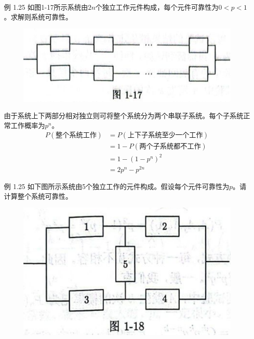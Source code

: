 \documentclass{beamer}
\begin{document}
	\begin{frame}
		例 1.25 如图1-17所示系统由$2n$个独立工作元件构成，每个元件可靠性为$0 < p < 1$。求解则系统可靠性。
		\begin{figure}[H]
			\centering
			\includegraphics[scale = 0.3]{figures/figure1-17.png}
		\end{figure}
	\end{frame}
	
	\begin{frame}
		由于系统上下两部分相对独立则可将整个系统分为两个串联子系统。每个子系统正常工作概率为$p^n$。
		\begin{align}
			P(\text{整个系统工作}) & = P(\text{上下子系统至少一个工作}) \\
			& = 1 - P(\text{两个子系统都不工作}) \\
			& = 1 - (1 - p^n)^2\\
			& = 2p^n - p^{2n}
		\end{align}
	\end{frame}
	
	\begin{frame}
		例 1.25 如下图所示系统由5个独立工作的元件构成。假设每个元件可靠性为$p$。请计算整个系统可靠性。
		\begin{figure}
			\centering
			\includegraphics[scale = 0.3]{figures/figure1-18.png}
		\end{figure}
	\end{frame}
	
\end{document}
